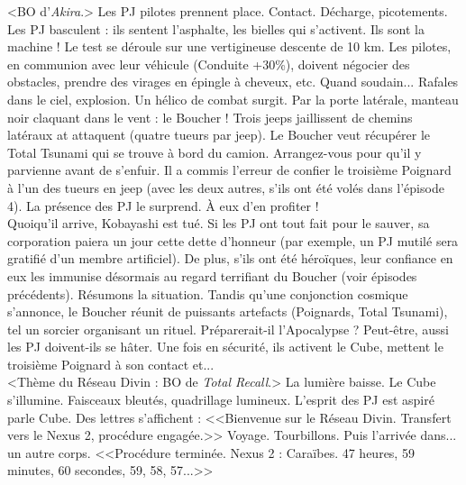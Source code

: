 \documentclass[11pt,twoside,a4paper]{book}
\begin{document}
<BO d'\emph{Akira}.> Les PJ pilotes prennent place. Contact. D{\'e}charge, picotements. Les PJ basculent : ils sentent l'asphalte, les bielles qui s'activent. Ils sont la machine ! Le test se d{\'e}roule sur une vertigineuse descente de 10 km. Les pilotes, en communion avec leur v{\'e}hicule (Conduite +30\%), doivent n{\'e}gocier des obstacles, prendre des virages en {\'e}pingle {\`a} cheveux, etc. Quand soudain... Rafales dans le ciel, explosion. Un h{\'e}lico de combat surgit. Par la porte lat{\'e}rale, manteau noir claquant dans le vent : le Boucher ! Trois jeeps jaillissent de chemins lat{\'e}raux at attaquent (quatre tueurs par jeep). Le Boucher veut r{\'e}cup{\'e}rer le Total Tsunami qui se trouve {\`a} bord du camion. Arrangez-vous pour qu'il y parvienne avant de s'enfuir. Il a commis l'erreur de confier le troisi{\`e}me Poignard {\`a} l'un des tueurs en jeep (avec les deux autres, s'ils ont {\'e}t{\'e} vol{\'e}s dans l'{\'e}pisode 4). La pr{\'e}sence des PJ le surprend. {\`A} eux d'en profiter !~\\

Quoiqu'il arrive, Kobayashi est tu{\'e}. Si les PJ ont tout fait pour le sauver, sa corporation paiera un jour cette dette d'honneur (par exemple, un PJ mutil{\'e} sera gratifi{\'e} d'un membre artificiel). De plus, s'ils ont {\'e}t{\'e} h{\'e}ro{\"i}ques, leur confiance en eux les immunise d{\'e}sormais au regard terrifiant du Boucher (voir {\'e}pisodes pr{\'e}c{\'e}dents). R{\'e}sumons la situation. Tandis qu'une conjonction cosmique s'annonce, le Boucher r{\'e}unit de puissants artefacts (Poignards, Total Tsunami), tel un sorcier organisant un rituel. Pr{\'e}parerait-il l'Apocalypse ? Peut-{\^e}tre, aussi les PJ doivent-ils se h{\^a}ter. Une fois en s{\'e}curit{\'e}, ils activent le Cube, mettent le troisi{\`e}me Poignard {\`a} son contact et...~\\

<Th{\`e}me du R{\'e}seau Divin : BO de \emph{Total Recall}.> La lumi{\`e}re baisse. Le Cube s'illumine. Faisceaux bleut{\'e}s, quadrillage lumineux. L'esprit des PJ est aspir{\'e} parle Cube. Des lettres s'affichent : <<Bienvenue sur le R{\'e}seau Divin. Transfert vers le Nexus 2, proc{\'e}dure engag{\'e}e.>> Voyage. Tourbillons. Puis l'arriv{\'e}e dans... un autre corps. <<Proc{\'e}dure termin{\'e}e. Nexus 2 : Cara{\"i}bes. 47 heures, 59 minutes, 60 secondes, 59, 58, 57...>>~\\

\clearpage

\end{document}
